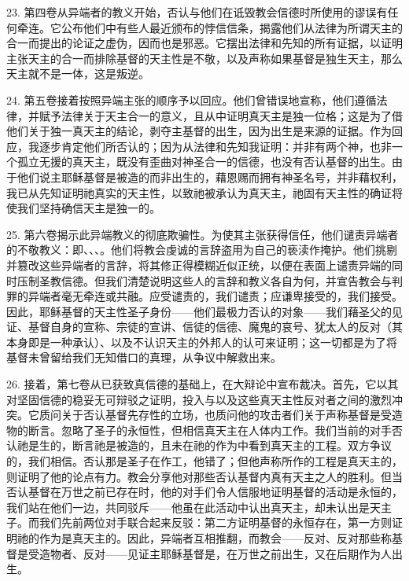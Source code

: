 23. 第四卷从异端者的教义开始，否认与他们在诋毁教会信德时所使用的谬误有任何牵连。它公布他们中有些人最近颁布的悖信信条，揭露他们从法律为所谓天主的合一而提出的论证之虚伪，因而也是邪恶。它摆出法律和先知的所有证据，以证明主张天主的合一而排除基督的天主性是不敬，以及声称如果基督是独生天主，那么天主就不是一体，这是叛逆。\par

24. 第五卷接着按照异端主张的顺序予以回应。他们曾错误地宣称，他们遵循法律，并赋予法律关于天主合一的意义，且从中证明真天主是独一位格；这是为了借他们关于独一真天主的结论，剥夺主基督的出生，因为出生是来源的证据。作为回应，我逐步肯定他们所否认的；因为从法律和先知我证明：并非有两个神，也非一个孤立无援的真天主，既没有歪曲对神圣合一的信德，也没有否认基督的出生。由于他们说主耶稣基督是被造的而非出生的，藉恩赐而拥有神圣名号，并非藉权利，我已从先知证明祂真实的天主性，以致祂被承认为真天主，祂固有天主性的确证将使我们坚持确信天主是独一的。\par

25. 第六卷揭示此异端教义的彻底欺骗性。为使其主张获得信任，他们谴责异端者的不敬教义：即、、、。他们将教会虔诚的言辞盗用为自己的亵渎作掩护。他们挑剔并篡改这些异端者的言辞，将其修正得模糊近似正统，以便在表面上谴责异端的同时压制圣教信德。但我们清楚说明这些人的言辞和教义各自为何，并宣告教会与判罪的异端者毫无牵连或共融。应受谴责的，我们谴责；应谦卑接受的，我们接受。因此，耶稣基督的天主性圣子身份——他们最极力否认的对象——我们藉圣父的见证、基督自身的宣称、宗徒的宣讲、信徒的信德、魔鬼的哀号、犹太人的反对（其本身即是一种承认）、以及不认识天主的外邦人的认可来证明；这一切都是为了将基督未曾留给我们无知借口的真理，从争议中解救出来。\par

26. 接着，第七卷从已获致真信德的基础上，在大辩论中宣布裁决。首先，它以其对坚固信德的稳妥无可辩驳之证明，投入与以及这些真天主性反对者之间的激烈冲突。它质问关于否认基督先存性的立场，也质问他的攻击者们关于声称基督是受造物的断言。忽略了圣子的永恒性，但相信真天主在人体内工作。我们当前的对手否认祂是生的，断言祂是被造的，且未在祂的作为中看到真天主的工程。双方争议的，我们相信。否认那是圣子在作工，他错了；但他声称所作的工程是真天主的，则证明了他的论点有力。教会分享他对那些否认基督内真有天主之人的胜利。但当否认基督在万世之前已存在时，他的对手们令人信服地证明基督的活动是永恒的，我们站在他们一边，共同驳斥——他虽在此活动中认出真天主，却未认出是天主子。而我们先前两位对手联合起来反驳：第二方证明基督的永恒存在，第一方则证明祂的作为是真天主的。因此，异端者互相推翻，而教会——反对、反对那些称基督是受造物者、反对——见证主耶稣基督是，在万世之前出生，又在后期作为人出生。\par

